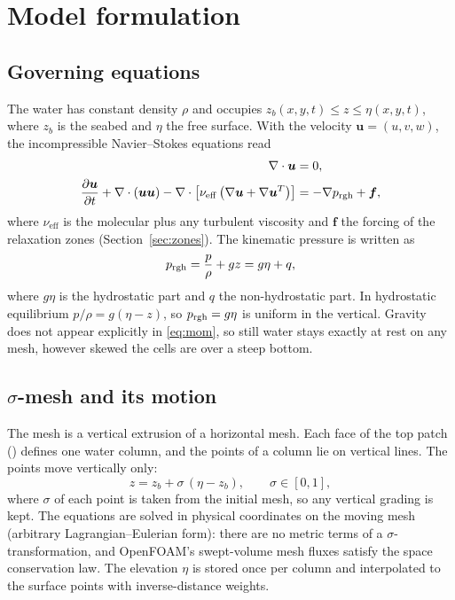 \section{Model formulation}
\label{sec:model}

\subsection{Governing equations}
\label{sec:equations}

The water has constant density $\rho$ and occupies
$z_b(x,y,t) \le z \le \eta(x,y,t)$, where $z_b$ is the seabed and $\eta$ the
free surface. With the velocity $\bm{u}=(u,v,w)$, the incompressible
Navier--Stokes equations read
\begin{align}
  \nabla\cdot\bm{u} &= 0, \label{eq:cont}\\
  \frac{\partial \bm{u}}{\partial t} + \nabla\cdot(\bm{u}\bm{u})
  - \nabla\cdot\left[\nu_{\mathrm{eff}}\left(\nabla\bm{u} + \nabla\bm{u}^{T}\right)\right]
  &= -\nabla p_{\mathrm{rgh}} + \bm{f}, \label{eq:mom}
\end{align}
where $\nu_{\mathrm{eff}}$ is the molecular plus any turbulent viscosity and
$\bm{f}$ the forcing of the relaxation zones (Section~\ref{sec:zones}). The
kinematic pressure is written as
\begin{equation}
  p_{\mathrm{rgh}} = \frac{p}{\rho} + g z = g\eta + q ,
  \label{eq:prgh}
\end{equation}
where $g\eta$ is the hydrostatic part and $q$ the non-hydrostatic part. In
hydrostatic equilibrium $p/\rho = g(\eta - z)$, so $p_{\mathrm{rgh}} = g\eta$ is uniform in
the vertical. Gravity does not appear explicitly in \eqref{eq:mom}, so still
water stays exactly at rest on any mesh, however skewed the cells are over a
steep bottom.

\subsection{$\sigma$-mesh and its motion}
\label{sec:sigma}

The mesh is a vertical extrusion of a horizontal mesh. Each face of the top
patch () defines one water column, and the points of a column lie
on vertical lines. The points move vertically only:
\begin{equation}
  z = z_b + \sigma\,(\eta - z_b), \qquad \sigma\in[0,1],
  \label{eq:sigma}
\end{equation}
where $\sigma$ of each point is taken from the initial mesh, so any vertical
grading is kept. The equations are solved in physical coordinates on the moving
mesh (arbitrary Lagrangian--Eulerian form): there are no metric terms of a
$\sigma$-transformation, and OpenFOAM's swept-volume mesh fluxes satisfy the
space conservation law. The elevation $\eta$ is stored once per column and
interpolated to the surface points with inverse-distance weights.

